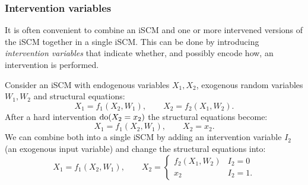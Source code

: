 \subsubsection{Intervention variables}

It is often convenient to combine an iSCM and one or more intervened versions of the iSCM together in a single iSCM.
This can be done by introducing \emph{intervention variables} that indicate whether, and possibly encode how, an intervention is performed.

\begin{Eg}
  Consider an iSCM with endogenous variables $X_1,X_2$, exogenous random variables $W_1,W_2$ and structural equations:
  $$X_1 = f_1(X_2,W_1), \qquad
    X_2 = f_2(X_1,W_2).$$
  After a hard intervention $\operatorname{do}(X_2=x_2)$ the structural equations become:
  $$X_1 = f_1(X_2,W_1), \qquad
    X_2 = x_2.$$
  We can combine both into a single iSCM by adding an intervention variable $I_2$ (an exogenous input variable) and change the structural equations into:
  $$X_1 = f_1(X_2,W_1), \qquad
    X_2 = \begin{cases}
      f_2(X_1,W_2) & I_2 = 0 \\
      x_2          & I_2 = 1.
    \end{cases}$$
\end{Eg}

